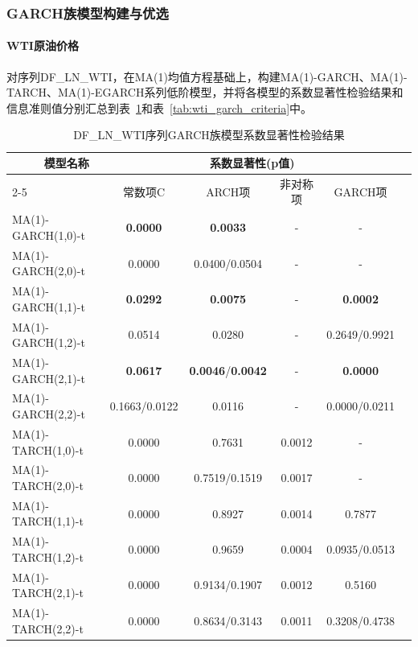 \documentclass[12pt,a4paper]{ctexart}
\let\subsubsubsection\paragraph%
\begin{document}
\subsubsection{GARCH族模型构建与优选}

\subsubsubsection{WTI原油价格}\hspace{0pt}\par

\vspace{6pt}

对序列DF\_LN\_WTI，在MA(1)均值方程基础上，构建MA(1)-GARCH、MA(1)-TARCH、MA(1)-EGARCH系列低阶模型，并将各模型的系数显著性检验结果和信息准则值分别汇总到表~\ref{tab:wti_garch_p}和表~\ref{tab:wti_garch_criteria}中。

\begin{table}[H]
\centering
\caption{DF\_LN\_WTI序列GARCH族模型系数显著性检验结果}
\label{tab:wti_garch_p}
\setlength{\tabcolsep}{4pt}  %
\begin{tabular}{lccccc}
\toprule[1.2pt]
\multirow{2}{*}{$\quad\quad\,\,\,\,\,$模型名称} & \multicolumn{4}{c}{系数显著性(p值)}  \\
\cmidrule(lr){2-5}
& 常数项C & ARCH项 & 非对称项 & GARCH项 \\
\midrule[0.75pt]
MA(1)-GARCH(1,0)-t     & \textbf{0.0000} & \textbf{0.0033} & - & - \\
MA(1)-GARCH(2,0)-t     & 0.0000 & 0.0400/0.0504 & - & - \\
MA(1)-GARCH(1,1)-t     & \textbf{0.0292} & \textbf{0.0075} & - & \textbf{0.0002} \\
MA(1)-GARCH(1,2)-t     & 0.0514 & 0.0280 & - & 0.2649/0.9921 \\
MA(1)-GARCH(2,1)-t     & \textbf{0.0617} & \textbf{0.0046}/\textbf{0.0042} & - & \textbf{0.0000} \\
MA(1)-GARCH(2,2)-t     & 0.1663/0.0122 & 0.0116 & - & 0.0000/0.0211 \\
\midrule
MA(1)-TARCH(1,0)-t     & 0.0000 & 0.7631 & 0.0012 & - \\
MA(1)-TARCH(2,0)-t     & 0.0000 & 0.7519/0.1519 & 0.0017 & - \\
MA(1)-TARCH(1,1)-t     & 0.0000 & 0.8927 & 0.0014 & 0.7877 \\
MA(1)-TARCH(1,2)-t     & 0.0000 & 0.9659 & 0.0004 & 0.0935/0.0513 \\
MA(1)-TARCH(2,1)-t     & 0.0000 & 0.9134/0.1907 & 0.0012 & 0.5160 \\
MA(1)-TARCH(2,2)-t     & 0.0000 & 0.8634/0.3143 & 0.0011 & 0.3208/0.4738 \\

\end{tabular}
\end{table}
\end{document}
